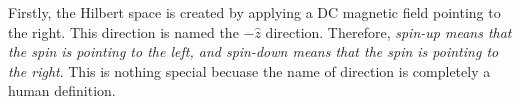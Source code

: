 \documentclass{article}
\begin{document}
Firstly, the Hilbert space is created by applying a DC magnetic field pointing to the right.
This direction is named the $-\hat{z}$ direction. Therefore, \textit{spin-up means that the spin is 
pointing to the left, and spin-down means that the spin is pointing to the right}. This is nothing
special becuase the name of direction is completely a human definition.
\printbibliography
\end{document}
